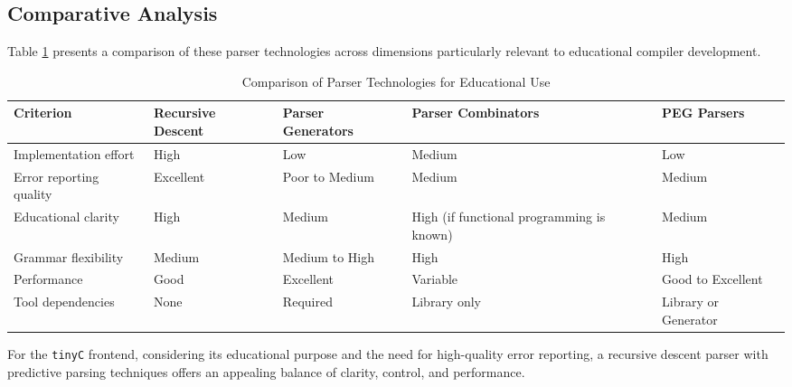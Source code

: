 \subsection{Comparative Analysis}

Table \ref{tab:parser-comparison} presents a comparison of these parser technologies across dimensions particularly relevant to educational compiler development.

\begin{table}[h]
    \centering
    \renewcommand{\arraystretch}{1.2}
    \caption{Comparison of Parser Technologies for Educational Use}
    \label{tab:parser-comparison}
    \begin{tabularx}{\textwidth}{|
        >{\raggedright\arraybackslash}p{2.6cm}|
        >{\centering\arraybackslash}X|
        >{\centering\arraybackslash}X|
        >{\centering\arraybackslash}X|
        >{\centering\arraybackslash}X|
      }
      \hline
      \textbf{Criterion} & \textbf{Recursive Descent} & \textbf{Parser Generators} & \textbf{Parser Combinators} & \textbf{PEG Parsers} \\
      \hline
      Implementation effort     & High                     & Low                       & Medium                        & Low                    \\
      \hline
      Error reporting quality   & Excellent                & Poor to Medium            & Medium                        & Medium                 \\
      \hline
      Educational clarity       & High                     & Medium                    & High (if functional programming is known) & Medium  \\
      \hline
      Grammar flexibility       & Medium                   & Medium to High            & High                          & High                   \\
      \hline
      Performance               & Good                     & Excellent                 & Variable                      & Good to Excellent      \\
      \hline
      Tool dependencies         & None                     & Required                  & Library only                  & Library or Generator   \\
      \hline
    \end{tabularx}
\end{table}  
  

For the \texttt{tinyC} frontend, considering its educational purpose and the need for high-quality error reporting, a recursive descent parser with predictive parsing techniques offers an appealing balance of clarity, control, and performance.

